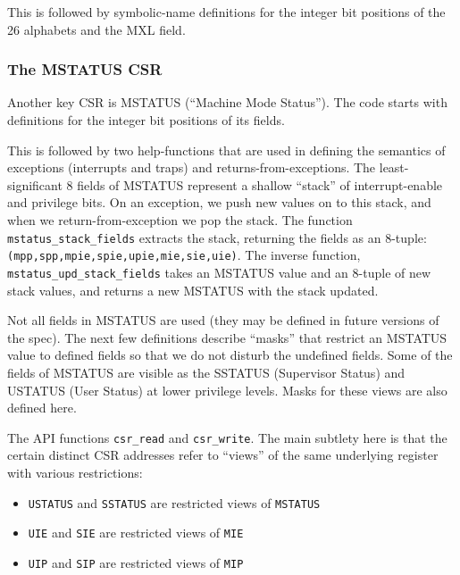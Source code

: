 \documentclass[11pt]{article}
\begin{document}


This is followed by symbolic-name definitions for the integer bit
positions of the 26 alphabets and the MXL field.




\subsubsection{The MSTATUS CSR}

Another key CSR is MSTATUS (``Machine Mode Status'').  The code starts
with definitions for the integer bit positions of its fields.

This is followed by two help-functions that are used in defining the
semantics of exceptions (interrupts and traps) and
returns-from-exceptions.  The least-significant 8 fields of MSTATUS
represent a shallow ``stack'' of interrupt-enable and privilege
bits. On an exception, we push new values on to this stack, and when
we return-from-exception we pop the stack. The function
\verb|mstatus_stack_fields| extracts the stack, returning the fields
as an 8-tuple: \verb|(mpp,spp,mpie,spie,upie,mie,sie,uie)|.  The
inverse function, \verb|mstatus_upd_stack_fields| takes an MSTATUS
value and an 8-tuple of new stack values, and returns a new MSTATUS
with the stack updated.

Not all fields in MSTATUS are used (they may be defined in future
versions of the spec).  The next few definitions describe ``masks''
that restrict an MSTATUS value to defined fields so that we do not
disturb the undefined fields.  Some of the fields of MSTATUS are
visible as the SSTATUS (Supervisor Status) and USTATUS (User Status)
at lower privilege levels.  Masks for these views are also defined
here.

The API functions \verb|csr_read| and \verb|csr_write|.  The main
subtlety here is that the certain distinct CSR addresses refer to
``views'' of the same underlying register with various restrictions:

\begin{itemize}
\item
\verb|USTATUS| and \verb|SSTATUS| are restricted views of \verb|MSTATUS|

\item
\verb|UIE| and \verb|SIE| are restricted views of \verb|MIE|

\item
\verb|UIP| and \verb|SIP| are restricted views of \verb|MIP|
\end{itemize}
\end{document}

